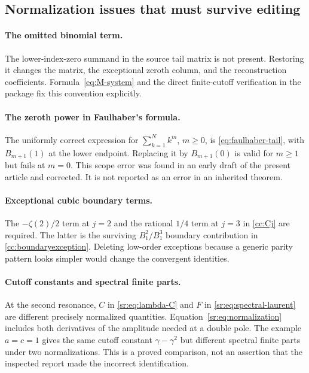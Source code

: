 \subsection{Normalization issues that must survive editing}

\paragraph{The omitted binomial term.}
The lower-index-zero summand in the source tail matrix is not present.
Restoring it changes the matrix, the exceptional zeroth column, and the
reconstruction coefficients. Formula~\eqref{eq:M-system} and the direct
finite-cutoff verification in the package fix this convention explicitly.

\paragraph{The zeroth power in Faulhaber's formula.}
The uniformly correct expression for $\sum_{k=1}^N k^m$, $m\ge0$,
is \eqref{eq:faulhaber-tail}, with $B_{m+1}(1)$ at the lower endpoint.
Replacing it by $B_{m+1}(0)$ is valid for $m\ge1$ but fails at $m=0$.
This scope error was found in an early draft of the present article and
corrected. It is not reported as an error in an inherited theorem.

\paragraph{Exceptional cubic boundary terms.}
The $-\zeta(2)/2$ term at $j=2$ and the rational $1/4$ term at $j=3$
in \eqref{cc:Cj} are required. The latter is the surviving
$B_1^2/B_1^3$ boundary contribution in \eqref{cc:boundaryexception}.
Deleting low-order exceptions because a generic parity pattern looks
simpler would change the convergent identities.

\paragraph{Cutoff constants and spectral finite parts.}
At the second resonance, $C$ in \eqref{sr:eq:lambda-C} and $F$ in
\eqref{sr:eq:spectral-laurent} are different precisely normalized
quantities. Equation~\eqref{sr:eq:normalization} includes both derivatives
of the amplitude needed at a double pole. The example $a=c=1$ gives
the same cutoff constant $\gamma-\gamma^2$ but different spectral
finite parts under two normalizations. This is a proved comparison,
not an assertion that the inspected report made the incorrect identification.


